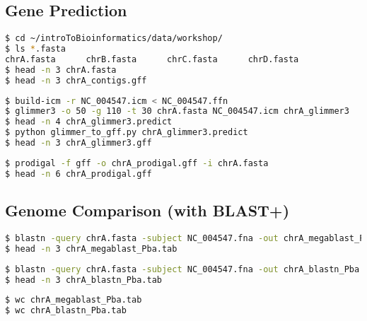 \documentclass[a4paper]{article}
\begin{document}
\subsection*{Gene Prediction}

\begin{lstlisting}[language=bash]
$ cd ~/introToBioinformatics/data/workshop/
$ ls *.fasta
chrA.fasta      chrB.fasta      chrC.fasta      chrD.fasta
$ head -n 3 chrA.fasta
$ head -n 3 chrA_contigs.gff
\end{lstlisting}


\begin{lstlisting}[language=bash]
$ build-icm -r NC_004547.icm < NC_004547.ffn
$ glimmer3 -o 50 -g 110 -t 30 chrA.fasta NC_004547.icm chrA_glimmer3
$ head -n 4 chrA_glimmer3.predict
$ python glimmer_to_gff.py chrA_glimmer3.predict
$ head -n 3 chrA_glimmer3.gff
\end{lstlisting}

\begin{lstlisting}[language=bash]
$ prodigal -f gff -o chrA_prodigal.gff -i chrA.fasta
$ head -n 6 chrA_prodigal.gff
\end{lstlisting}

\subsection*{Genome Comparison (with BLAST+)}

\begin{lstlisting}[language=bash]
$ blastn -query chrA.fasta -subject NC_004547.fna -out chrA_megablast_Pba.tab -outfmt 6
$ head -n 3 chrA_megablast_Pba.tab
\end{lstlisting}

\begin{lstlisting}[language=bash]
$ blastn -query chrA.fasta -subject NC_004547.fna -out chrA_blastn_Pba.tab -outfmt 6 -task blastn
$ head -n 3 chrA_blastn_Pba.tab
\end{lstlisting}

\begin{lstlisting}[language=bash]
$ wc chrA_megablast_Pba.tab
$ wc chrA_blastn_Pba.tab
\end{lstlisting}

\end{document}
